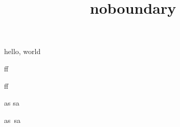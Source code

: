 \documentclass{amsart}
\title{noboundary}
\begin{document}
\maketitle

hello, world

ff

f\noboundary f

{\selectfont as sa}

{\selectfont as\noboundary\ sa}
\end{document}
